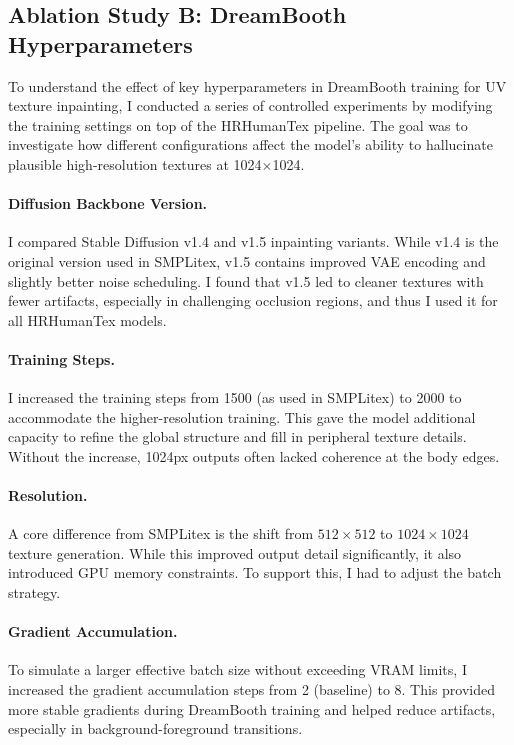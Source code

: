 \subsection{Ablation Study B: DreamBooth Hyperparameters}

To understand the effect of key hyperparameters in DreamBooth training for UV texture inpainting, I conducted a series of controlled experiments by modifying the training settings on top of the HRHumanTex pipeline. The goal was to investigate how different configurations affect the model’s ability to hallucinate plausible high-resolution textures at 1024$\times$1024.

\paragraph{Diffusion Backbone Version.}
I compared Stable Diffusion v1.4 and v1.5 inpainting variants. While v1.4 is the original version used in SMPLitex, v1.5 contains improved VAE encoding and slightly better noise scheduling. I found that v1.5 led to cleaner textures with fewer artifacts, especially in challenging occlusion regions, and thus I used it for all HRHumanTex models.

\paragraph{Training Steps.}
I increased the training steps from 1500 (as used in SMPLitex) to 2000 to accommodate the higher-resolution training. This gave the model additional capacity to refine the global structure and fill in peripheral texture details. Without the increase, 1024px outputs often lacked coherence at the body edges.

\paragraph{Resolution.}
A core difference from SMPLitex is the shift from $512\times512$ to $1024\times1024$ texture generation. While this improved output detail significantly, it also introduced GPU memory constraints. To support this, I had to adjust the batch strategy.

\paragraph{Gradient Accumulation.}
To simulate a larger effective batch size without exceeding VRAM limits, I increased the gradient accumulation steps from 2 (baseline) to 8. This provided more stable gradients during DreamBooth training and helped reduce artifacts, especially in background-foreground transitions.

